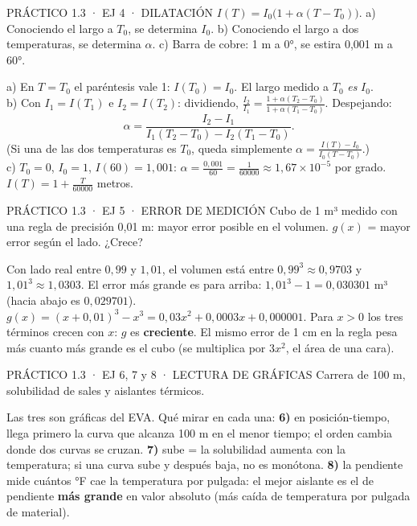 \begin{enunciado}{PRÁCTICO 1.3 · EJ 4 · DILATACIÓN}
$I(T)=I_0\big(1+\alpha(T-T_0)\big)$. a) Conociendo el largo a $T_0$, se determina $I_0$. b) Conociendo el largo a dos temperaturas, se determina $\alpha$. c) Barra de cobre: 1 m a 0°, se estira 0,001 m a 60°.
\end{enunciado}
a) En $T=T_0$ el paréntesis vale 1: $I(T_0)=I_0$. El largo medido a $T_0$ \emph{es} $I_0$.\\[2pt]
b) Con $I_1=I(T_1)$ e $I_2=I(T_2)$: dividiendo, $\frac{I_2}{I_1}=\frac{1+\alpha(T_2-T_0)}{1+\alpha(T_1-T_0)}$. Despejando:
\[\alpha=\frac{I_2-I_1}{I_1(T_2-T_0)-I_2(T_1-T_0)}.\]
(Si una de las dos temperaturas es $T_0$, queda simplemente $\alpha=\frac{I(T)-I_0}{I_0(T-T_0)}$.)\\[2pt]
c) $T_0=0$, $I_0=1$, $I(60)=1{,}001$: $\alpha=\frac{0{,}001}{60}=\frac1{60000}\approx1{,}67\times10^{-5}$ por grado. $I(T)=1+\frac T{60000}$ metros.

\begin{enunciado}{PRÁCTICO 1.3 · EJ 5 · ERROR DE MEDICIÓN}
Cubo de 1 m³ medido con una regla de precisión 0,01 m: mayor error posible en el volumen. $g(x)$ = mayor error según el lado. ¿Crece?
\end{enunciado}
Con lado real entre $0{,}99$ y $1{,}01$, el volumen está entre $0{,}99^3\approx0{,}9703$ y $1{,}01^3\approx1{,}0303$. El error más grande es para arriba: $1{,}01^3-1=0{,}030301$ m³ (hacia abajo es $0{,}029701$).
$g(x)=(x+0{,}01)^3-x^3=0{,}03x^2+0{,}0003x+0{,}000001$.
Para $x>0$ los tres términos crecen con $x$: $g$ es \textbf{creciente}. El mismo error de 1 cm en la regla pesa más cuanto más grande es el cubo (se multiplica por $3x^2$, el área de una cara).

\begin{enunciado}{PRÁCTICO 1.3 · EJ 6, 7 y 8 · LECTURA DE GRÁFICAS}
Carrera de 100 m, solubilidad de sales y aislantes térmicos.
\end{enunciado}
\begin{falta}
Las tres son gráficas del EVA. Qué mirar en cada una: \textbf{6)} en posición-tiempo, llega primero la curva que alcanza 100 m en el menor tiempo; el orden cambia donde dos curvas se cruzan. \textbf{7)} sube = la solubilidad aumenta con la temperatura; si una curva sube y después baja, no es monótona. \textbf{8)} la pendiente mide cuántos °F cae la temperatura por pulgada: el mejor aislante es el de pendiente \textbf{más grande} en valor absoluto (más caída de temperatura por pulgada de material).
\end{falta}

